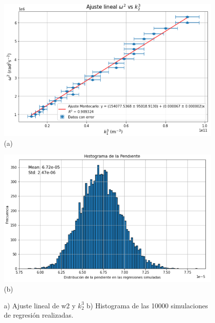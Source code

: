 \begin{figure}[H]
	\centering
	\begin{minipage}{0.47\textwidth} 
		\includegraphics[width=\textwidth]{grafico_02x06_w2k23.png}
		\centering(a)
	\end{minipage}
	\hspace{0.5cm}
	\begin{minipage}{0.47\textwidth} 
		\includegraphics[width=1\textwidth]{grafico_02x07_w2k23hist.png}
		\centering (b)
	\end{minipage}
	\caption{ \footnotesize {a) Ajuste lineal de w2 y $k_2^3$  b) Histograma de las 10000 simulaciones de regresión realizadas.}}
	\label{fig:w2k1}
\end{figure}

